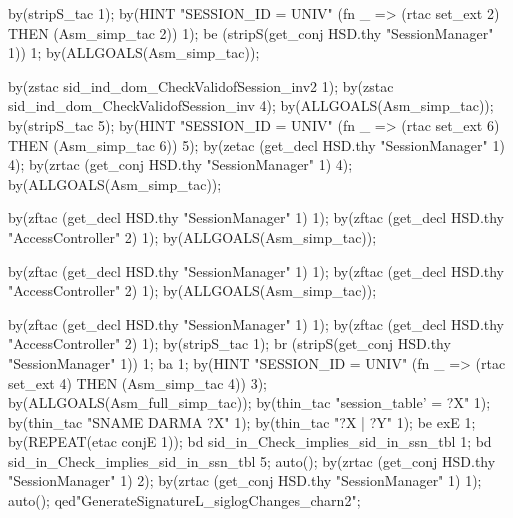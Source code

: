 \documentclass[a4paper,pdftex]{article}
\newenvironment{holz-proof}{\comment}{\endcomment}
\begin{document}
\begin{holz-proof}
by(stripS_tac 1);
by(HINT "SESSION_ID = UNIV" (fn _ => (rtac set_ext 2) THEN (Asm_simp_tac 2)) 1);
be (stripS(get_conj HSD.thy "SessionManager" 1)) 1;
by(ALLGOALS(Asm_simp_tac));

by(zstac sid_ind_dom_CheckValidofSession_inv2 1);
by(zstac sid_ind_dom_CheckValidofSession_inv 4);
by(ALLGOALS(Asm_simp_tac));
by(stripS_tac 5);
by(HINT "SESSION_ID = UNIV" (fn _ => (rtac set_ext 6) THEN (Asm_simp_tac 6)) 5);
by(zetac (get_decl HSD.thy "SessionManager" 1) 4);
by(zrtac (get_conj HSD.thy "SessionManager" 1) 4);
by(ALLGOALS(Asm_simp_tac));

  by(zftac (get_decl HSD.thy "SessionManager" 1) 1);
  by(zftac (get_decl HSD.thy "AccessController" 2) 1);
by(ALLGOALS(Asm_simp_tac));


  by(zftac (get_decl HSD.thy "SessionManager" 1) 1);
  by(zftac (get_decl HSD.thy "AccessController" 2) 1);
by(ALLGOALS(Asm_simp_tac));

  by(zftac (get_decl HSD.thy "SessionManager" 1) 1);
  by(zftac (get_decl HSD.thy "AccessController" 2) 1);
by(stripS_tac 1);
br (stripS(get_conj HSD.thy "SessionManager" 1)) 1; ba 1;
by(HINT "SESSION_ID = UNIV" (fn _ => (rtac set_ext 4) THEN (Asm_simp_tac 4)) 3);
by(ALLGOALS(Asm_full_simp_tac));
by(thin_tac "session_table' = ?X" 1);
by(thin_tac "SNAME DARMA ?X" 1);
by(thin_tac "?X | ?Y" 1);
be exE 1;
by(REPEAT(etac conjE 1));
bd sid_in_Check_implies_sid_in_ssn_tbl 1;
bd sid_in_Check_implies_sid_in_ssn_tbl 5;
auto();
by(zrtac (get_conj HSD.thy "SessionManager" 1) 2);
by(zrtac (get_conj HSD.thy "SessionManager" 1) 1);
auto();
qed"GenerateSignatureL_siglogChanges_charn2";




\end{holz-proof}
\end{document}
